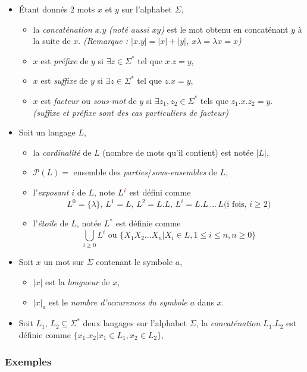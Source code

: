 \documentclass{article}
\newcommand{\titre}[1]{\textcolor{title}{#1}}
\newcommand{\tsssect}[1]{\titre{\subsubsection{#1}}}
\newcommand{\term}[1]{\textit{\textcolor{maintitle}{#1}}}
\begin{document}
\begin{sffamily}
\begin{itemize}
\item Étant donnés 2 mots $x$ et $y$ sur l'alphabet $\Sigma$,
	\begin{itemize}
	\item la \term{concaténation} $x.y$ \textit{(noté aussi $xy$)}
	est le mot obtenu en concaténant $y$ à la suite de $x$. \textit{(Remarque : $|x.y| = |x|+|y|$, $x\lambda = \lambda 
	x = x$)}
	\item $x$ est \term{préfixe} de $y$ si $\exists z \in \Sigma^*$ tel que $x.z = y$,
	\item $x$ est \term{suffixe} de $y$ si $\exists z \in \Sigma^*$ tel que $z.x = y$,
	\item $x$ est \term{facteur} ou \term{sous-mot} de $y$ si $\exists z_1,z_2 \in \Sigma^*$ tels que $z_1.x.z_2=y$.\\ 
	\textit{(\term{suffixe} et \term{préfixe} sont des cas particuliers de \term{facteur})}
	\end{itemize}
\item Soit un langage $L$,
	\begin{itemize}
	\item la \term{cardinalité} de $L$ (nombre de mots qu'il contient) est notée $|L|$,
	\item $\mathcal{P}(L) = $ ensemble des \term{parties}/\term{sous-ensembles} de $L$,
	\item l'\term{exposant $i$} de $L$, note $L^\term{i}$ est défini comme 
		$$ L^0 = \{\lambda\},\, L^1 = L,\, L^2 = L.L,\, L^i = L.L\,...\,L \text{(i fois, }i\geq 2) $$
	\item l'\term{étoile} de $L$, notée $L^*$ est définie comme 
	$$ \bigcup_{i\geq0} {L^i} \text{ ou } \{X_1X_2...X_n | X_i \in L, 1 \leq i \leq n, n\geq 0\}$$
	\end{itemize}
\item Soit $x$ un mot sur $\Sigma$ contenant le symbole $a$,
	\begin{itemize}
	\item $|x|$ est la \term{longueur} de $x$,
	\item $|x|_a$ est le \term{nombre d'occurences du symbole $a$} dans $x$.
	\end{itemize}
\item Soit $L_1$, $L_2 \subseteq \Sigma^*$ deux langages sur l'alphabet $\Sigma$, la \term{concaténation} $L_1.L_2$ est définie comme $\{x_1.x_2 | x_1 \in L_1, x_2 \in L_2\}$,
\end{itemize}

\tsssect{Exemples}


\end{sffamily}
\end{document}
